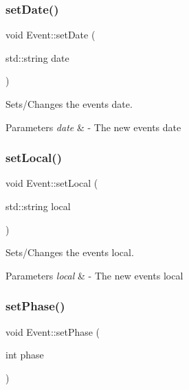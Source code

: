 \subsubsection{\texorpdfstring{set\+Date()}{setDate()}}
{\footnotesize\ttfamily void Event\+::set\+Date (\begin{DoxyParamCaption}\item[{std\+::string}]{date }\end{DoxyParamCaption})}



Sets/\+Changes the event\textquotesingle{}s date. 


\begin{DoxyParams}{Parameters}
{\em date} & -\/ The new event\textquotesingle{}s date \\
\hline
\end{DoxyParams}
\mbox{\label{classEvent_ab4e1fd7cd5e56f58d3cd36a69e475054}} 
\subsubsection{\texorpdfstring{set\+Local()}{setLocal()}}
{\footnotesize\ttfamily void Event\+::set\+Local (\begin{DoxyParamCaption}\item[{std\+::string}]{local }\end{DoxyParamCaption})}



Sets/\+Changes the event\textquotesingle{}s local. 


\begin{DoxyParams}{Parameters}
{\em local} & -\/ The new event\textquotesingle{}s local \\
\hline
\end{DoxyParams}
\mbox{\label{classEvent_ab630975b378bad5230ae550b3e9ffc9a}} 
\subsubsection{\texorpdfstring{set\+Phase()}{setPhase()}}
{\footnotesize\ttfamily void Event\+::set\+Phase (\begin{DoxyParamCaption}\item[{int}]{phase }\end{DoxyParamCaption})}



